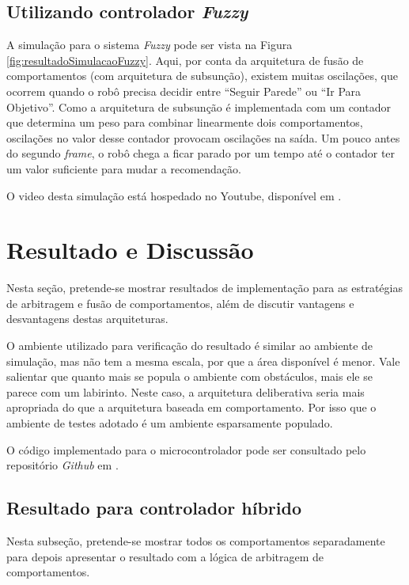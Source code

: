 	\subsection{Utilizando controlador \textit{Fuzzy}}
	
	A simulação para o sistema \textit{Fuzzy} pode ser vista na Figura 
	\ref{fig:resultadoSimulacaoFuzzy}. Aqui, por conta da arquitetura de fusão de 
	comportamentos (com arquitetura de subsunção), existem muitas oscilações, que 
	ocorrem quando o robô precisa decidir entre ``Seguir Parede'' ou ``Ir Para Objetivo''. 
	Como a arquitetura de subsunção é implementada com um contador que determina um peso 
	para combinar linearmente dois comportamentos, oscilações no valor desse contador 
	provocam oscilações na saída. Um pouco antes do segundo \textit{frame}, o robô chega 
	a ficar parado por um tempo até o contador ter um valor suficiente para mudar a 
	recomendação. 
	
	
	
	O video desta simulação está hospedado no Youtube, disponível em 
	.
	
\section{Resultado e Discussão}

	Nesta seção, pretende-se mostrar resultados de implementação para as estratégias de 
	arbitragem e fusão de comportamentos, além de discutir vantagens e desvantagens destas 
	arquiteturas.
	
	O ambiente utilizado para verificação do resultado é similar ao ambiente de simulação, mas não tem a mesma
	escala, por que a área disponível é menor. Vale salientar que quanto mais se popula o ambiente com obstáculos,
	mais ele se parece com um labirinto. Neste caso, a arquitetura deliberativa seria mais apropriada do que a 
	arquitetura baseada em comportamento. Por isso que o ambiente de testes adotado é um ambiente esparsamente 
	populado.
	
	O código implementado para o microcontrolador pode ser consultado pelo repositório 
	\textit{Github} em .
	 
	\subsection{Resultado para controlador híbrido}
	
	Nesta subseção, pretende-se mostrar todos os comportamentos separadamente para 
	depois apresentar o resultado com a lógica de arbitragem de comportamentos.
	
